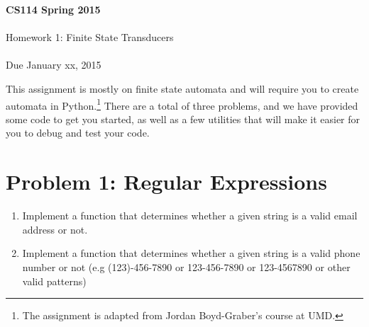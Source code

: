 \documentclass[11pt]{article}
\begin{document}
\begin{center}
{\Large{\textbf{CS114 Spring 2015}}}\\
\mbox{}\\
{\Large{Homework 1: Finite State Transducers}}\\
\mbox{}\\
{\large{Due January xx, 2015}}\\
\end{center}


{}

This assignment is mostly on finite state automata and will require you to
create automata in Python.\footnote{ 
The assignment is adapted from Jordan Boyd-Graber's course at UMD.} 
There are a total of three problems, and we
have provided some code to get you started, as well as a few utilities
that will make it easier for you to debug and test your code.  

\section*{Problem 1: Regular Expressions}
\begin{enumerate}
\item Implement a function that determines whether a given string is a valid email address or not.
\item Implement a function that determines whether a given string is a valid phone number or not (e.g (123)-456-7890 or 123-456-7890 or 123-4567890 or other valid patterns)
\end{enumerate}
\end{document}
